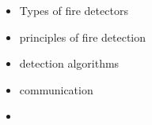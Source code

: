 \begin{itemize}
    \item Types of fire detectors
    \item principles of fire detection
    \item detection algorithms
    \item communication
    \item 
\end{itemize}
